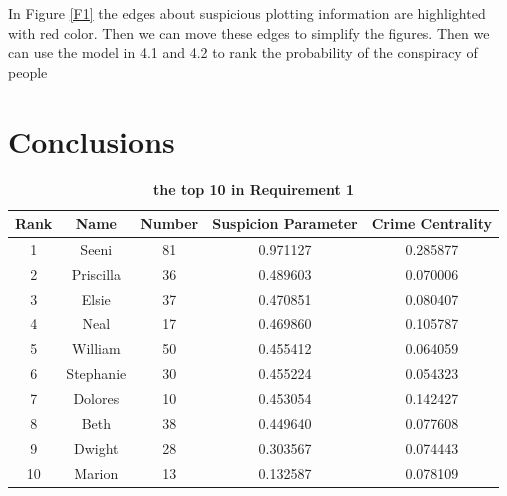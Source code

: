 \documentclass[12pt]{article}
\begin{document}
	In Figure \ref{F1} the edges about suspicious plotting information are highlighted with red color. Then we can move these edges to simplify the figures. Then we can use the model in 4.1 and 4.2 to rank the probability of the conspiracy of people

\section{Conclusions}

\begin{table}[!htb]
\centering
{}
\begin{tabular}{c|c|c|c|c}
\toprule[2pt] 
\textbf{Rank} & \textbf{Name} & \textbf{Number} & \textbf{Suspicion Parameter} & \textbf{Crime Centrality} \\
\hline
1 & Seeni & 81 & 0.971127 & 0.285877 \\
2 & Priscilla & 36 & 0.489603 & 0.070006 \\
3 & Elsie & 37 & 0.470851 & 0.080407 \\
4 & Neal & 17 & 0.469860 & 0.105787 \\
5 & William & 50 & 0.455412 & 0.064059 \\
6 & Stephanie & 30 & 0.455224 & 0.054323 \\
7 & Dolores & 10 & 0.453054 & 0.142427 \\
8 & Beth & 38 & 0.449640 & 0.077608 \\
9 & Dwight & 28 & 0.303567 & 0.074443 \\
10 & Marion & 13 & 0.132587 & 0.078109 \\
\hline
\end{tabular}
\caption{\textbf{the top 10 in Requirement 1}}
\label{2_7_8}
\end{table}
\end{document}
